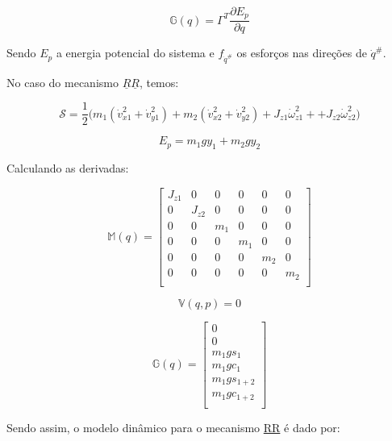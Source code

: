 \begin{itemize}
\begin{itemize}
	\begin{equation}
	\mathbb{G}(q) =  \Gamma^T \frac{\partial E_p}{\partial q}
	\end{equation}
	
	Sendo $E_p$ a energia potencial do sistema e $f_{\dot{q}^{\#}}$ os esfor\c{c}os nas dire\c{c}\~oes de $\dot{q}^{\#}$.
	
	No caso do mecanismo $\underline{R}\underline{R}$, temos:
	
	\begin{equation}
	\mathcal{S} = \frac{1}{2} \Big( m_1 ( \dot{v}_{x1}^2 + \dot{v}_{y1}^2 ) + m_2 ( \dot{v}_{x2}^2 + \dot{v}_{y2}^2  ) + J_{z1} \dot{\omega}_{z1}^2 + + J_{z2} \dot{\omega}_{z2}^2 \Big)
	\end{equation}
	
	\begin{equation}
	E_p = m_1 g y_1 + m_2 g y_2
	\end{equation}
	
	Calculando as derivadas:
	
	\begin{equation}
	\mathbb{M}(q) =
	\begin{bmatrix}
	J_{z1} & 0 & 0 & 0 & 0 & 0 \\
	0 & J_{z2} & 0 & 0 & 0 & 0 \\
	0 & 0 & m_1 & 0 & 0 & 0 \\
	0 & 0 & 0 & m_1 & 0 & 0 \\
	0 & 0 & 0 & 0 & m_2 & 0 \\
	0 & 0 & 0 & 0 & 0 & m_2 \\
	\end{bmatrix}
	\end{equation}
	
	\begin{equation}
	\mathbb{V}(q,p) = 0
	\end{equation}
	
	\begin{equation}
	\mathbb{G}(q) =
	\begin{bmatrix}
	0 \\
	0 \\
	m_1 g s_1 \\
	m_1 g c_1 \\
	m_1 g s_{1+2} \\
	m_1 g c_{1+2}\\
	\end{bmatrix}
	\end{equation}
	
	Sendo assim, o modelo dinâmico para o mecanismo \underline{R}\underline{R} é dado por:
	

\end{itemize}
\end{itemize}
